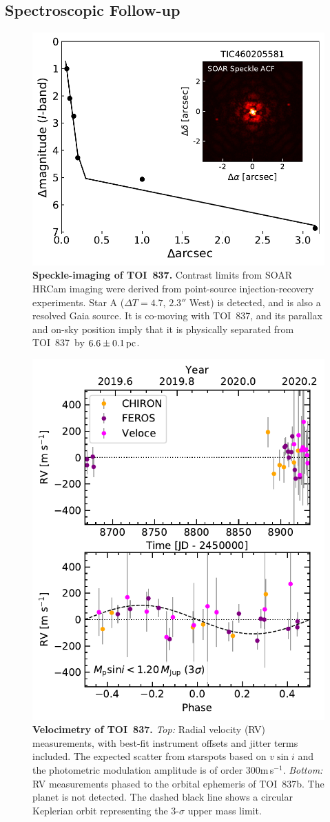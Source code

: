 \documentclass[12pt,twocolumn,tighten]{aastex63}
\newcommand{\tn}{TOI~837} %
\newcommand{\pn}{TOI~837b} %
\begin{document}



\subsection{Spectroscopic Follow-up}
\label{subsec:spectra}

\begin{figure}[!t]
	\begin{center}
		\leavevmode
		\includegraphics[width=.44\textwidth]{f4.pdf}
	\end{center}
	\vspace{-0.7cm}
	\caption{
    {\bf Speckle-imaging of \tn.} Contrast limits from SOAR HRCam
    imaging were derived from point-source injection-recovery
    experiments. Star A ($\Delta T=4.7$, $2.3''$ West) is detected,
    and is also a resolved Gaia source.  It is co-moving with \tn, and
    its parallax and on-sky position imply that it is physically
    separated from \tn\ by $6.6\pm 0.1\,{\rm pc}$.
    \label{fig:speckle}
	}
\end{figure}

\begin{figure}[!t]
	\begin{center}
		\leavevmode
		\includegraphics[width=.47\textwidth]{f5.pdf}
	\end{center}
	\vspace{-0.7cm}
	\caption{
    {\bf Velocimetry of \tn.} {\it Top:} Radial velocity (RV)
    measurements, with best-fit instrument offsets and jitter terms
    included.  The expected scatter from starspots based on $v\sin i$
    and the photometric modulation amplitude is of order
    300m$\,$s$^{-1}$.  {\it Bottom:} RV measurements phased to the
    orbital ephemeris of \pn.  The planet is not detected.  The dashed black
    line shows a circular Keplerian orbit representing the 3-$\sigma$
    upper mass limit.
    \label{fig:rvs}
	}
\end{figure}
\end{document}
